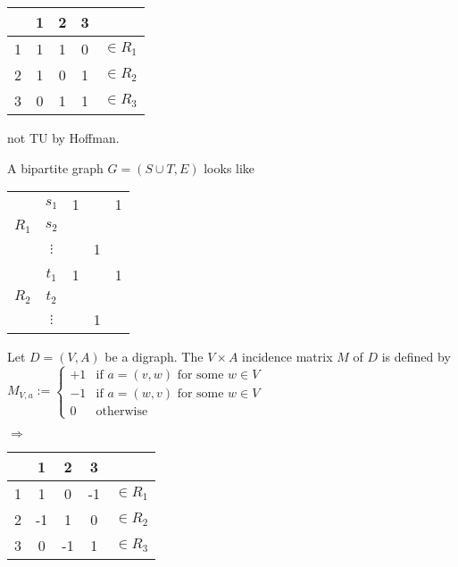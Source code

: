 
\begin{tabular}{c|ccc|c}
	  & 1 & 2 & 3 & \\
	  \hline
	1 & 1 & 1 & 0 & $\in R_1$\\
	2 & 1 & 0 & 1 & $\in R_2$ \\
	3 & 0 & 1 & 1 & $\in R_3$ \\
\end{tabular}
not TU by Hoffman.
	
A bipartite graph $G=(S \cup T, E)$ looks like
\begin{tabular}{c|c|ccc|}
  		& $s_1$ & 1 & & 1 \\
$R_1$ 	& $s_2$ & & & \\
		& $\vdots$ & & 1 & \\
\hline
  		& $t_1$ & 1 & & 1 \\
$R_2$ 	& $t_2$ & & & \\
		& $\vdots$ & & 1 & \\
\end{tabular}

\begin{defn}
Let $D=(V,A)$ be a digraph. The $V \times A $ incidence matrix $M$ of $D$ is
defined by 
$M_{V,a}:=\begin{cases}
			+1 & \text{if } a=(v,w) \text{ for some } w \in V\\
			-1 & \text{if } a=(w,v) \text{ for some } w \in V\\
			0 & \text{otherwise}
		\end{cases}
$
\end{defn}

$\Rightarrow$
\begin{tabular}{c|ccc|c}
	  & 1 & 2 & 3 & \\
	  \hline
	1 & 1 & 0 & -1 & $\in R_1$\\
	2 & -1 & 1 & 0 & $\in R_2$ \\
	3 & 0 & -1 & 1 & $\in R_3$ \\
\end{tabular}
